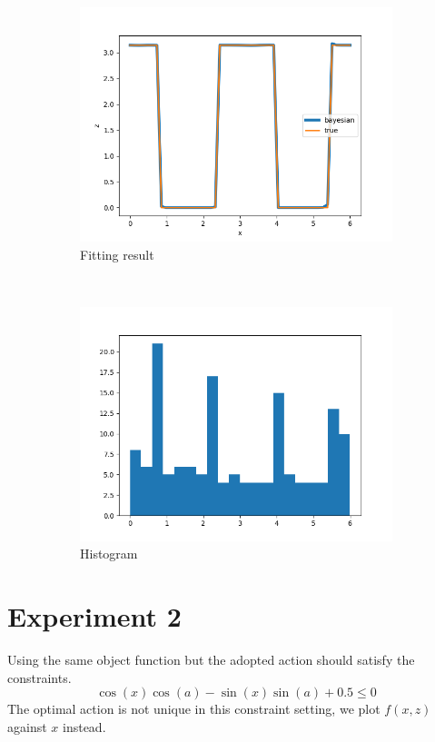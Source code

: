 \documentclass{article}
\begin{document}
\begin{figure}[!ht]
    \begin{subfigure}[b]{0.49\textwidth}
        \centering
        \includegraphics[width=\textwidth]{./cbo_1.png}
        \caption{Fitting result}
        \label{fig:rk_order_compare}
    \end{subfigure}~
    \begin{subfigure}[b]{0.49\textwidth}
      \centering
      \includegraphics[width=\textwidth]{./cbo_1_hist.png}
      \caption{Histogram}
      \label{fig:time_equal_verify}
    \end{subfigure}
    \caption{}
\end{figure}

\section{Experiment 2}
Using the same object function but the adopted action should
satisfy the constraints.
\begin{equation}
    \cos(x)  \cos(a) - \sin(x) \sin(a) + 0.5 \leq 0    
\end{equation}
The optimal action is not unique in this constraint
setting, we plot $f(x,z)$ against $x$ instead.
\end{document}
